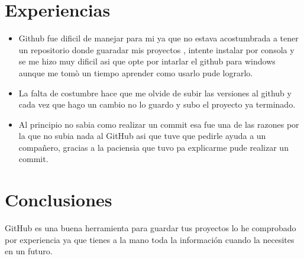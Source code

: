  \section{ Experiencias}
\begin{itemize}
 \item Github fue dificil de manejar  para mi ya que no estava acostumbrada a tener un repositorio donde guaradar mis proyectos , intente instalar por consola y se me hizo muy dificil asi que opte por intarlar el github para windows aunque me tomò un tiempo aprender como usarlo pude lograrlo. 
 \item La falta de costumbre hace que me olvide de subir las versiones al github y cada vez que hago un cambio no lo guardo y subo el proyecto ya terminado.
\item Al principio no sabia como realizar un commit esa fue  una de las razones por la que no subia nada al GitHub asi que tuve que pedirle ayuda a un compañero, gracias a la paciensia que tuvo pa explicarme pude realizar un commit.
\end{itemize}
 \section{ Conclusiones}
GitHub es una buena herramienta para guardar tus proyectos lo he comprobado por experiencia ya que tienes a la mano toda la información cuando la necesites en un futuro.
%

